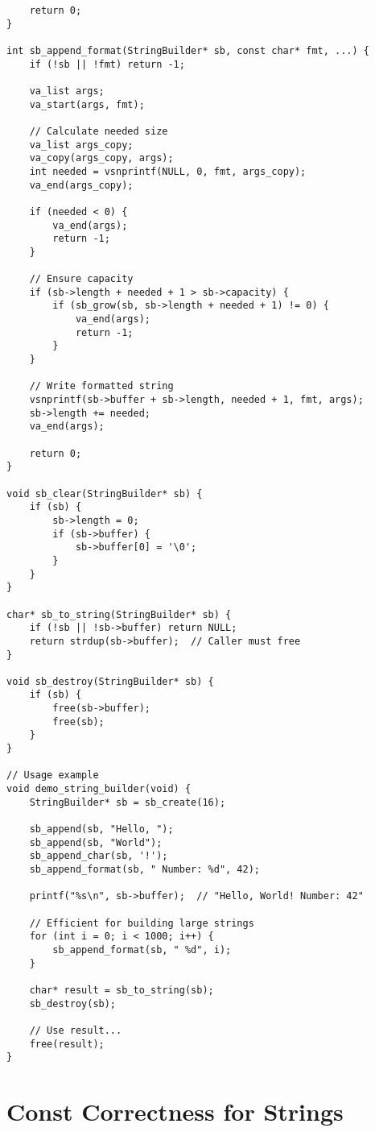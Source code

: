 \begin{lstlisting}
    return 0;
}

int sb_append_format(StringBuilder* sb, const char* fmt, ...) {
    if (!sb || !fmt) return -1;

    va_list args;
    va_start(args, fmt);

    // Calculate needed size
    va_list args_copy;
    va_copy(args_copy, args);
    int needed = vsnprintf(NULL, 0, fmt, args_copy);
    va_end(args_copy);

    if (needed < 0) {
        va_end(args);
        return -1;
    }

    // Ensure capacity
    if (sb->length + needed + 1 > sb->capacity) {
        if (sb_grow(sb, sb->length + needed + 1) != 0) {
            va_end(args);
            return -1;
        }
    }

    // Write formatted string
    vsnprintf(sb->buffer + sb->length, needed + 1, fmt, args);
    sb->length += needed;
    va_end(args);

    return 0;
}

void sb_clear(StringBuilder* sb) {
    if (sb) {
        sb->length = 0;
        if (sb->buffer) {
            sb->buffer[0] = '\0';
        }
    }
}

char* sb_to_string(StringBuilder* sb) {
    if (!sb || !sb->buffer) return NULL;
    return strdup(sb->buffer);  // Caller must free
}

void sb_destroy(StringBuilder* sb) {
    if (sb) {
        free(sb->buffer);
        free(sb);
    }
}

// Usage example
void demo_string_builder(void) {
    StringBuilder* sb = sb_create(16);

    sb_append(sb, "Hello, ");
    sb_append(sb, "World");
    sb_append_char(sb, '!');
    sb_append_format(sb, " Number: %d", 42);

    printf("%s\n", sb->buffer);  // "Hello, World! Number: 42"

    // Efficient for building large strings
    for (int i = 0; i < 1000; i++) {
        sb_append_format(sb, " %d", i);
    }

    char* result = sb_to_string(sb);
    sb_destroy(sb);

    // Use result...
    free(result);
}
\end{lstlisting}

\section{Const Correctness for Strings}


